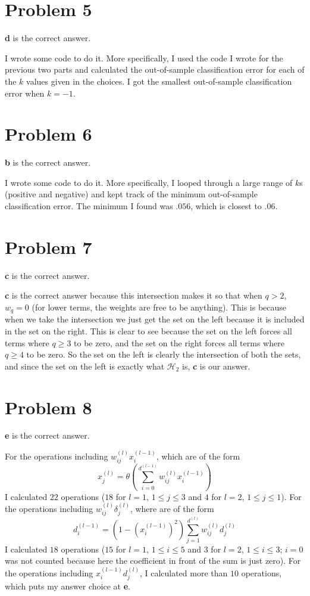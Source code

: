 \documentclass{article}
\begin{document}
\section*{Problem 5}
\textbf{d} is the correct answer.

\noindent I wrote some code to do it. More specifically, I used the code
I wrote for the previous two parts and calculated the out-of-sample
classification error for each of the $k$ values given in the choices. I got
the smallest out-of-sample classification error when $k = -1$.

\section*{Problem 6}
\textbf{b} is the correct answer.

\noindent I wrote some code to do it. More specifically, I looped through
a large range of $k$s (positive and negative) and kept track of the minimum
out-of-sample classification error. The minimum I found was $.056$, which is
closest to $.06$.

\section*{Problem 7}
\textbf{c} is the correct answer.

\noindent \textbf{c} is the correct answer because this intersection makes
it so that when $q > 2$, $w_q = 0$ (for lower terms, the weights are free to
be anything). This is because when we take the intersection
we just get the set on the left because it is included in the set on the right.
This is clear to see because the set on the left forces all terms where
$q \geq 3$ to be zero, and the set on the right forces all terms where
$q \geq 4$ to be zero. So the set on the left is clearly the intersection of
both the sets, and since the set on the left is exactly what $\mathcal{H}_2$ is,
\textbf{c} is our answer.

\section*{Problem 8}
\textbf{e} is the correct answer.

\noindent For the operations including $w_{ij}^{(l)}x_i^{(l-1)}$, which
are of the form
\[ x_j^{(l)} = \theta(\sum_{i=0}^{d^{(l-1)}} w_{ij}^{(l)} x_i^{(l-1)}) \]
I calculated $22$ operations ($18$ for $l = 1$, $1 \leq j \leq 3$ and $4$
for $l=2$, $1 \leq j \leq 1$). For the operations including
$w_{ij}^{(l)}\delta_{j}^{(l)}$, where are of the form
\[ d_i^{(l-1)} = (1-(x_i^{(l-1)})^2) \sum_{j=1}^{d^{(l)}} w_{ij}^{(l)} d_j^{(l)} \]
I calculated $18$ operations ($15$ for $l=1$,
$1 \leq i \leq 5$ and $3$ for $l=2$, $1 \leq i \leq 3$; $i=0$ was not counted
because here the coefficient
in front of the sum is just zero). For the operations including $x_i^{(l-1)}
d_j^{(l)}$, I calculated more than $10$ operations, which puts my answer
choice at \textbf{e}.
\end{document}
